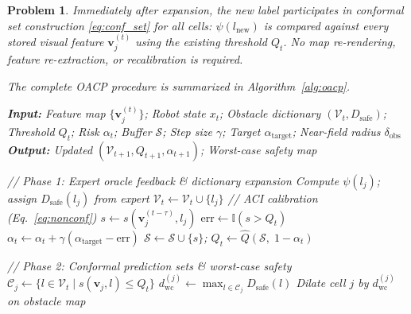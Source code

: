 \documentclass[letterpaper, 10 pt, conference]{ieeeconf}  %
\newtheorem{myprob}{\bf Problem}
\begin{document}
\begin{myprob}
Immediately after expansion, the new label participates in conformal set construction \eqref{eq:conf_set} for all cells: $\psi(l_{\text{new}})$ is compared against every stored visual feature $\mathbf{v}_j^{(t)}$ using the existing threshold $Q_t$. No map re-rendering, feature re-extraction, or recalibration is required.

The complete OACP procedure is summarized in Algorithm~\ref{alg:oacp}.

\begin{algorithm}[t]
\caption{Open-Vocabulary Adaptive Conformal Prediction (OACP)}
\label{alg:oacp}
\hspace*{0.02in} {\bf Input:}
Feature map $\{\mathbf{v}_j^{(t)}\}$; Robot state $x_t$; Obstacle dictionary $(\mathcal{V}_t, D_{\text{safe}})$; Threshold $Q_t$; Risk $\alpha_t$; Buffer $\mathcal{S}$; Step size $\gamma$; Target $\alpha_{\text{target}}$; Near-field radius $\delta_{\text{obs}}$\\
\hspace*{0.02in} {\bf Output:}
Updated $(\mathcal{V}_{t+1}, Q_{t+1}, \alpha_{t+1})$; Worst-case safety map
\begin{algorithmic}[1]
\State \textit{// Phase 1: Expert oracle feedback \& dictionary expansion}
     
        \State Compute $\psi(l_j)$; assign $D_{\text{safe}}(l_j)$ from expert
        \State $\mathcal{V}_t \gets \mathcal{V}_t \cup \{l_j\}$ 
    \EndIf
    \State \textit{// ACI calibration (Eq.~\ref{eq:nonconf})}
    \State $s \gets s(\mathbf{v}_j^{(t-\tau)}, l_j)$ 
    \State $\text{err} \gets \mathbb{I}(s > Q_t)$
    \State $\alpha_t \gets \alpha_t + \gamma(\alpha_{\text{target}} - \text{err})$
    \State $\mathcal{S} \gets \mathcal{S} \cup \{s\}$;\; $Q_t \gets \hat{Q}(\mathcal{S},\; 1 - \alpha_t)$
\EndFor

\vspace{0.05in}
\State \textit{// Phase 2: Conformal prediction sets \& worst-case safety}
    \State $\mathcal{C}_j \gets \{l \in \mathcal{V}_t \mid s(\mathbf{v}_j,l) \le Q_t\}$ 
    \State $d_{\text{wc}}^{(j)} \gets \max_{l \in \mathcal{C}_j} D_{\text{safe}}(l)$ 
    \State Dilate cell $j$ by $d_{\text{wc}}^{(j)}$ on obstacle map
\EndFor
\end{algorithmic}
\end{algorithm}


\end{myprob}
\end{document}
